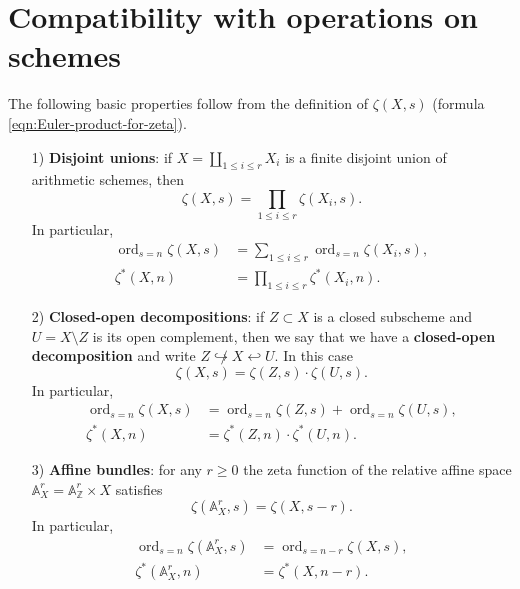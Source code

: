 \documentclass[10pt,a4paper,oneside]{article}
\DeclareMathOperator{\ord}{ord}
\newcommand{\ZZ}{\mathbb{Z}}
\renewcommand{\AA}{\mathbb{A}}
\theoremstyle{myplain}
\theoremstyle{mydefinition}
\numberwithin{equation}{section}
\begin{document}

\section{Compatibility with operations on schemes}
\label{sec:compatibility-with-operations}

The following basic properties follow from the definition of $\zeta (X,s)$
(formula \eqref{eqn:Euler-product-for-zeta}).

\begin{enumerate}
\item[1)] \textbf{Disjoint unions}: if $X = \coprod_{1 \le i \le r} X_i$ is a
  finite disjoint union of arithmetic schemes, then
  \begin{equation}
    \label{eqn:zeta-function-for-disjoint-unions}
    \zeta (X,s) = \prod_{1 \le i \le r} \zeta (X_i,s).
  \end{equation}
  In particular,
  \begin{align*}
    \ord_{s=n} \zeta (X,s) & = \sum_{1 \le i \le r} \ord_{s=n} \zeta (X_i,s), \\
    \zeta^* (X,n) & = \prod_{1 \le i \le r} \zeta^* (X_i,n).
  \end{align*}

\item[2)] \textbf{Closed-open decompositions}: if $Z \subset X$ is a closed
  subscheme and $U = X\setminus Z$ is its open complement, then we say that we
  have a \textbf{closed-open decomposition} and write
  $Z \not\hookrightarrow X \hookleftarrow U$. In this case
  \begin{equation}
    \label{eqn:zeta-function-for-closed-open-decompositions}
    \zeta (X,s) = \zeta (Z,s) \cdot \zeta (U,s).
  \end{equation}
  In particular,
  \begin{align*}
    \ord_{s=n} \zeta (X,s) & = \ord_{s=n} \zeta (Z,s) + \ord_{s=n} \zeta (U,s), \\
    \zeta^* (X,n) & = \zeta^* (Z,n) \cdot \zeta^* (U,n).
  \end{align*}

\item[3)] \textbf{Affine bundles}: for any $r \ge 0$ the zeta function of the
  relative affine space $\AA^r_X = \AA^r_\ZZ \times X$ satisfies
  \begin{equation}
    \label{eqn:zeta-function-for-affine-space}
    \zeta (\AA^r_X, s) = \zeta (X, s-r).
  \end{equation}
  In particular,
  \begin{align*}
    \ord_{s=n} \zeta (\AA^r_X, s) & = \ord_{s=n-r} \zeta (X, s), \\
    \zeta^* (\AA^r_X, n) & = \zeta^* (X, n-r).
  \end{align*}
\end{enumerate}
\end{document}
